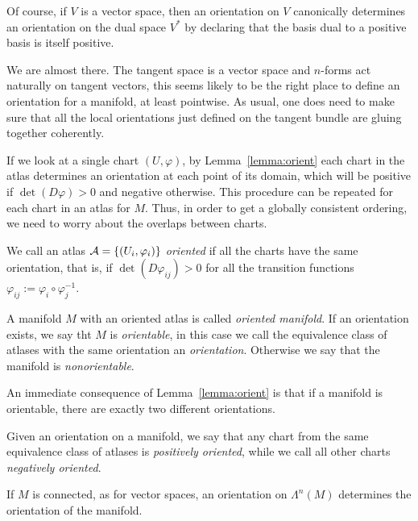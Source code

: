 \begin{remark}
  Of course, if $V$ is a vector space, then an orientation on $V$ canonically determines an orientation on the dual space $V^*$ by declaring that the basis dual to a positive basis is itself positive.
\end{remark}

We are almost there.
The tangent space is a vector space and $n$-forms act naturally on tangent vectors, this seems likely to be the right place to define an orientation for a manifold, at least pointwise.
As usual, one does need to make sure that all the local orientations just defined on the tangent bundle are gluing together coherently.

\begin{remark}
  If we look at a single chart $(U,\varphi)$, by Lemma~\ref{lemma:orient} each chart in the atlas determines an orientation at each point of its domain, which will be positive if $\det(D\varphi)>0$ and negative otherwise.
  This procedure can be repeated for each chart in an atlas for $M$.
  Thus, in order to get a globally consistent ordering, we need to worry about the overlaps between charts.
\end{remark}

\begin{definition}
  We call an atlas $\mathcal{A} = \{(U_i,\varphi_i)\}$ \emph{oriented} if all the charts have the same orientation, that is, if $\det(D\varphi_{ij}) > 0$ for all the transition functions $\varphi_{ij} := \varphi_i\circ\varphi_j^{-1}$.

  A manifold $M$ with an oriented atlas is called \emph{oriented manifold}.
  If an orientation exists, we say tht $M$ is \emph{orientable}, in this case we call the equivalence class of atlases with the same orientation an \emph{orientation}.
  Otherwise we say that the manifold is \emph{nonorientable}.
\end{definition}

An immediate consequence of Lemma~\ref{lemma:orient} is that if a manifold is orientable, there are exactly two different orientations.

\begin{definition}
  Given an orientation on a manifold, we say that any chart from the same equivalence class of atlases is \emph{positively oriented}, while we call all other charts \emph{negatively oriented}.
\end{definition}

If $M$ is connected, as for vector spaces, an orientation on $\Lambda^n(M)$ determines the orientation of the manifold.

